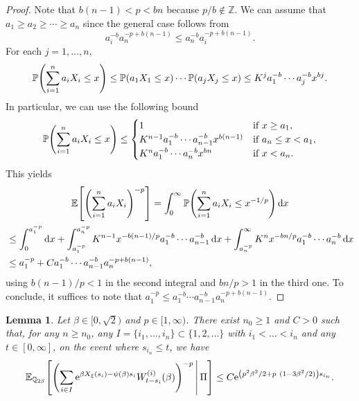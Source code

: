 \documentclass[10pt]{amsart}
\newtheorem{lemm}[theo]{Lemma}\newtheorem{prop}[theo]{Proposition}\newtheorem{coro}[theo]{Corollary}\newtheorem{conj}[theo]{Conjecture}
\theoremstyle{definition}\newtheorem{defi}[theo]{Definition}\newtheorem{rema}[theo]{Remark}\newtheorem{exam}[theo]{Example}\newtheorem{exem}[theo]{Example}\newtheorem{nota}[theo]{Notation}
\newcommand{\e}{\mathrm{e}}
\renewcommand{\d}[1]{\mathop{}\!\mathrm{d}#1}
\newcommand{\E}{\mathbb{E}}
\renewcommand{\P}{\mathbb{P}}
\newcommand{\Q}{\mathbb{Q}}
\newcommand{\Z}{\mathbb{Z}}
\newcommand\1{\mathds{1}}
\newcommand{\Expec}[1]{\mathbb{E}\left[#1\right]}
\let\originalleft\left
\let\originalright\right
\renewcommand{\left}{\mathopen{}\mathclose\bgroup\originalleft}
\renewcommand{\right}{\aftergroup\egroup\originalright}
\begin{document}
\begin{proof}
Note that $b(n - 1) < p < bn$ because $p/b \notin \Z$. We can assume that $a_1 \geq a_2 \geq \cdots \geq a_n$ since the general case follows from
\begin{equation*}
a_i^{-b} a_n^{-p + b(n - 1)} \leq a_n^{-b} a_i^{-p + b(n - 1)}.
\end{equation*}
For each $j = 1, \dots, n$,
\begin{equation*}
\P \left(\sum_{i = 1}^n a_i X_i \leq x \right) \leq \P\left(a_1 X_1 \leq x\right) \cdots \P\left(a_j X_j \leq x\right) \leq K^j a_1^{-b} \cdots a_j^{-b} x^{bj}.
\end{equation*}
In particular, we can use the following bound
\begin{equation*}
\P \left(\sum_{i = 1}^n a_i X_i \leq x \right) \leq
\begin{cases}
1 & \text{if } x \geq a_1, \\
K^{n - 1} a_1^{-b} \cdots a_{n-1}^{-b} x^{b(n-1)} & \text{if } a_n \leq x < a_1, \\
K^n a_1^{-b} \cdots a_n^{-b} x^{bn} & \text{if } x < a_n.
\end{cases}
\end{equation*}
This yields
\begin{multline*}
\Expec{\left(\sum_{i = 1}^n a_i X_i \right)^{-p}} = \int_0^\infty \P \left(\sum_{i = 1}^n a_i X_i \leq x^{-1/p} \right) \d{x}  \\
\begin{aligned}
&\leq \int_0^{a_1^{-p}} \d{x} + \int_{a_1^{-p}}^{a_n^{-p}} K^{n - 1} x^{-b(n-1)/p} a_1^{-b} \cdots a_{n-1}^{-b} \d{x} + \int_{a_n^{-p}}^\infty K^n x^{-bn/p} a_1^{-b} \cdots a_n^{-b} \d{x}  \\
&\leq a_1^{-p} + C a_1^{-b} \cdots a_{n - 1}^{-b} a_n^{-p + b(n-1)},
\end{aligned}
\end{multline*}
using $b(n-1)/p<1$ in the second integral and $bn/p >1$ in the third one. To conclude, it suffices to note that $a_1^{-p} \leq a_1^{-b} \cdots a_{n-1}^{-b} a_n^{-p + b(n-1)}$.
\end{proof}


\begin{lemm}\label{lem:bound_for_negative_moments}
Let $\beta \in [0, \sqrt{2})$ and $p \in [1, \infty)$. There exist $n_0\geq 1$ and $C > 0$ such that, for any $n \geq n_0$, any $I = \{i_1, \dots, i_n\} \subset \{1, 2, \dots\}$ with $i_1 < \dots < i_n$ and any $t \in [0, \infty]$, on the event where $s_{i_n} \leq t$, we have
\begin{equation}\label{eq:bound_for_negative_moments}
\E_{\Q_{2\beta}} \left[\left(\sum_{i \in I} \e^{\beta X_\xi(s_i) - \psi(\beta)s_i} W_{t - s_i}^{(i)}(\beta) \right)^{-p} \,\middle|\, \Pi \right] \leq C \e^{\left(p^2\beta^2/2 + p~(1 - 3\beta^2/2)\right)s_{i_n}}.
\end{equation}
\end{lemm}
\end{document}
